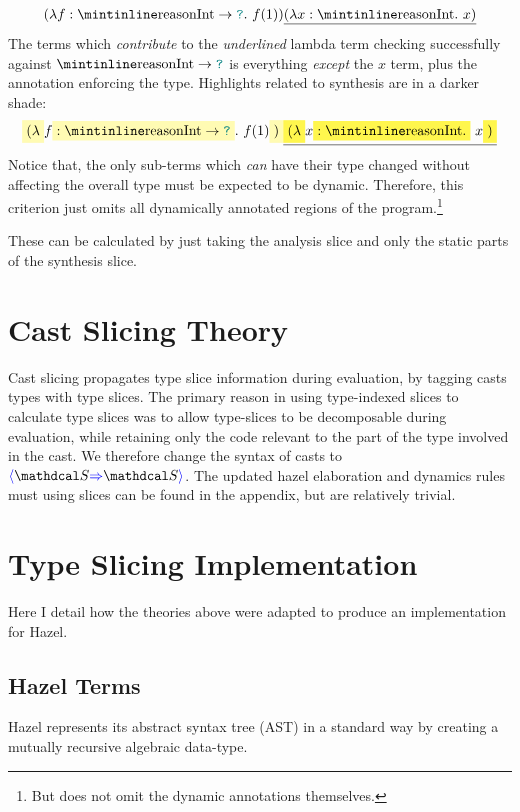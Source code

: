 \[(\lambda f: \code{Int} \to \dyn.\ f(1))\underline{(\lambda x : \code{Int}.\ x)}\]
The terms which \textit{contribute} to the \textit{underlined} lambda term checking successfully against $\code{Int} \to \dyn$ is everything \textit{except} the $x$ term, plus the annotation enforcing the type. Highlights related to synthesis are in a darker shade:
\[\hlcmaths[yellow!30]{(\lambda} f\hlcmaths[yellow!30]{: \code{Int} \to \dyn}.\ f(1)\hlcmaths[yellow!30]{)}\underline{\hlcmaths[yellow!70]{(\lambda} x \hlcmaths[yellow!70]{: \code{Int}.}\ x\hlcmaths[yellow!70]{)}}\]
Notice that, the only sub-terms which \textit{can} have their type changed without affecting the overall type must be expected to be dynamic. Therefore, this criterion just omits all dynamically annotated regions of the program.\footnote{But does not omit the dynamic annotations themselves.}

These can be calculated by just taking the analysis slice and only the static parts of the synthesis slice.

\section{Cast Slicing Theory}\label{sec:CastSlicingTheory}
Cast slicing propagates type slice information during evaluation, by tagging casts types with type slices. The primary reason in using type-indexed slices to calculate type slices was to allow type-slices to be decomposable during evaluation, while retaining only the code relevant to the part of the type involved in the cast. We therefore change the syntax of casts to $\scast{\S}{\S}$. The updated hazel elaboration and dynamics rules must using slices can be found in the appendix, but are relatively trivial.

\section{Type Slicing Implementation}\label{sec:TypeSlicingImplementation}
Here I detail how the theories above were adapted to produce an implementation for Hazel.
\subsection{Hazel Terms}
\label{sec:HazelTerms}
Hazel represents its abstract syntax tree (AST) in a standard way by creating a mutually recursive algebraic data-type. 

